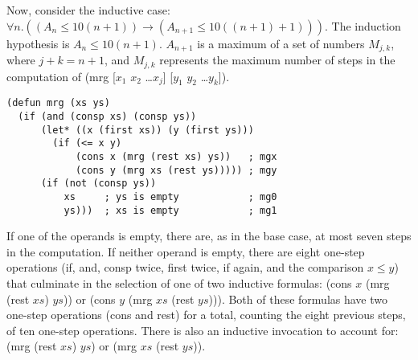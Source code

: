 Now, consider the inductive case:
$\forall n.((A_n \leq 10(n+1)) \rightarrow (A_{n+1} \leq 10((n+1) + 1)))$.
The induction hypothesis is $A_n \leq 10(n + 1)$.
$A_{n+1}$ is a maximum of a set of numbers $M_{j,k}$, where $j + k = n+1$,
and $M_{j,k}$ represents the maximum number of steps in the computation of
\textsf{(mrg [$x_1$ $x_2$ \dots $x_j$] [$y_1$ $y_2$ \dots $y_k$])}.

\label{defun:mrg-copy}
\begin{code}
\begin{verbatim}
(defun mrg (xs ys)
  (if (and (consp xs) (consp ys))
      (let* ((x (first xs)) (y (first ys)))
        (if (<= x y)
            (cons x (mrg (rest xs) ys))   ; mgx
            (cons y (mrg xs (rest ys))))) ; mgy
      (if (not (consp ys))
          xs     ; ys is empty            ; mg0
          ys)))  ; xs is empty            ; mg1
\end{verbatim}
\end{code}

If one of the operands is empty, there are, as in the base case,
at most seven steps in the computation.
If neither operand is empty, there are eight one-step operations
(\textsf{if}, \textsf{and}, \textsf{consp} twice,
\textsf{first} twice, \textsf{if} again, and the comparison $x \leq y$)
that culminate in the selection of
one of two inductive formulas: \textsf{(cons $x$ (mrg (rest $xs$) $ys$))}
or \textsf{(cons $y$ (mrg $xs$ (rest $ys$)))}.
Both of these formulas have two one-step operations (\textsf{cons} and \textsf{rest})
for a total, counting the eight previous steps, of ten one-step operations.
There is also an inductive invocation to account for:
\textsf{(mrg (rest $xs$) $ys$) or (mrg $xs$ (rest $ys$))}.

